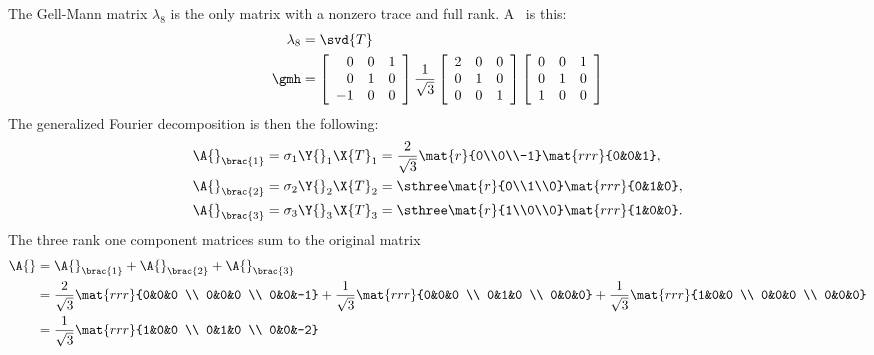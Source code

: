 The Gell-Mann matrix $\lambda_{8}$ is the only matrix with a nonzero trace and full rank. A \svdl \ is this:
\begin{equation}
  \begin{split}
    \lambda_{8} &= \svd{T}\\
    \gmh&=\left[
\begin{array}{rrr}
 0 & 0 & 1 \\
 0 & 1 & 0 \\
 -1 & 0 & 0
\end{array}
\right]
\frac{1}{\sqrt{3}}\left[
\begin{array}{ccc}
 2 & 0 & 0 \\
 0 & 1 & 0 \\
 0 & 0 & 1
\end{array}
\right]\left[
\begin{array}{ccc}
 0 & 0 & 1 \\
 0 & 1 & 0 \\
 1 & 0 & 0
\end{array}
\right]
  \end{split}
\end{equation}
The generalized Fourier decomposition is then the following:
\begin{equation}
  \begin{split}
     \A{}_{\brac{1}} &= \sigma_{1}  \Y{}_{1}  \X{T}_{1} = \frac{2}{\sqrt{3}} \mat{r}{0\\0\\-1} \mat{rrr}{0&0&1}, \\
     \A{}_{\brac{2}} &= \sigma_{2}  \Y{}_{2}  \X{T}_{2} = \sthree            \mat{r}{0\\1\\0}  \mat{rrr}{0&1&0}, \\
     \A{}_{\brac{3}} &= \sigma_{3}  \Y{}_{3}  \X{T}_{3} = \sthree            \mat{r}{1\\0\\0}  \mat{rrr}{1&0&0}.
  \end{split}
\end{equation}
The three rank one component matrices sum to the original matrix
\begin{equation}
  \begin{split}
    \A{} 
    &= \A{}_{\brac{1}} + \A{}_{\brac{2}} + \A{}_{\brac{3}} \\
    &=\frac{2}{\sqrt{3}}  \mat{rrr}{0&0&0 \\ 0&0&0 \\ 0&0&-1} + \frac{1}{\sqrt{3}}  \mat{rrr}{0&0&0 \\ 0&1&0 \\ 0&0&0} + \frac{1}{\sqrt{3}}  \mat{rrr}{1&0&0 \\ 0&0&0 \\ 0&0&0}\\
    &=\frac{1}{\sqrt{3}} \mat{rrr}{1&0&0 \\ 0&1&0 \\ 0&0&-2}
  \end{split}
\end{equation}



